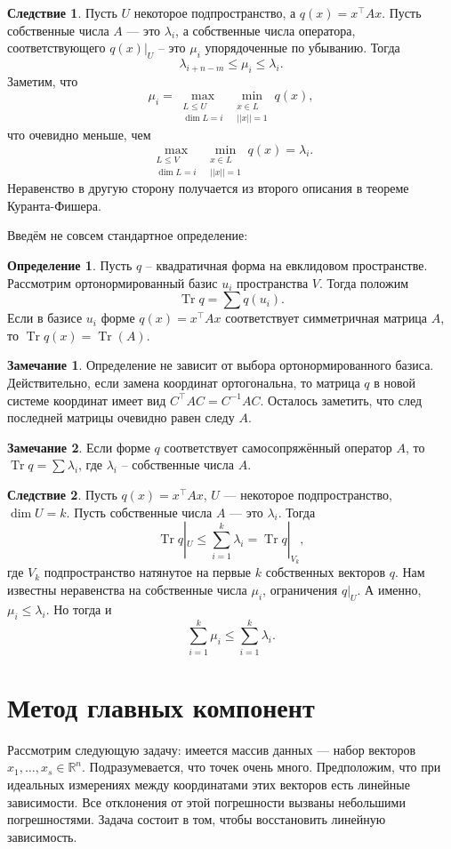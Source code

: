 \documentclass[10pt,a4paper,oneside]{book}
\theoremstyle{definition}
\newtheorem*{rem}{\color{green!50!blue}Замечание}
\newtheorem*{defn}{\color{yellow!30!red} Определение}
\newtheorem{cor}{\color{green!45!black}Следствие}
\renewcommand{\leq}{\leqslant}
\newcommand{\mb}[1]{\mathbb{#1}}
\newcommand{\Tr}{\operatorname{Tr}}
\def\dfn{\begin{defn}}
\def\edfn{\end{defn}}
\def\crl{\begin{cor}}
\def\ecrl{\end{cor}}
\def\rm{\begin{rem}}
\def\erm{\end{rem}}
\begin{document}
\crl Пусть $U$ некоторое подпространство, а $q(x)=x^{\top} Ax$. Пусть собственные числа $A$ --- это $\lambda_i$, а собственные числа оператора, соответствующего $q(x)|_U$ -- это $\mu_i$ упорядоченные по убыванию. Тогда 
$$\lambda_{i+n-m}\leq \mu_i\leq \lambda_i.$$  
\proof Заметим, что
 $$\mu_i=\max_{\substack{L\leq U\\ \dim L=i}} \min_{\substack{ x\in L \\ ||x||=1}} q(x),$$
что очевидно меньше, чем 
$$\max_{\substack{L\leq V\\ \dim L=i}} \min_{\substack{ x\in L \\ ||x||=1}} q(x)=\lambda_i.$$ Неравенство в другую сторону получается из второго описания в теореме Куранта-Фишера.
\endproof
\ecrl


Введём не совсем стандартное определение:
\dfn
Пусть $q$ -- квадратичная форма на евклидовом пространстве. Рассмотрим ортонормированный базис $u_i$ пространства $V$. Тогда положим 
$$\Tr q= \sum q(u_i).$$ Если в базисе $u_i$ форме $q(x)=x^{\top} Ax $ соответствует симметричная матрица $A$, то $\Tr q(x)=\Tr(A)$.
\edfn

\rm Определение не зависит от выбора ортонормированного базиса. Действительно, если замена координат ортогональна, то матрица $q$ в новой системе координат имеет вид $C^{\top}AC=C^{-1}AC$. Осталось заметить, что след последней матрицы очевидно равен следу $A$.
\erm

\rm Если форме $q$ соответствует самосопряжённый оператор $A$, то $\Tr q=\sum \lambda_i$, где $\lambda_i$ -- собственные числа $A$.
\erm




\crl Пусть $q(x)=x^{\top} Ax$, $U$ --- некоторое подпространство, $\dim U=k$. Пусть собственные числа $A$ --- это $\lambda_i$. Тогда $$\Tr q|_U\leq \sum_{i=1}^k \lambda_i= \Tr q|_{V_k},$$
где $V_k$ подпространство натянутое на первые $k$ собственных векторов $q$.
\proof Нам известны неравенства на собственные числа $\mu_i$, ограничения $q|_U$. А именно, $\mu_i\leq \lambda_i$. Но тогда и $$\sum_{i=1}^k \mu_i \leq \sum_{i=1}^k \lambda_i.$$
\endproof
\ecrl 






\section{Метод главных компонент}

Рассмотрим следующую задачу: имеется массив данных --- набор векторов $x_1,\dots,x_s \in \mb R^n$. Подразумевается, что точек очень много. Предположим, что при идеальных измерениях между координатами этих векторов есть линейные зависимости. Все отклонения от этой погрешности вызваны небольшими погрешностями. Задача состоит в том, чтобы восстановить линейную зависимость. 
\end{document}
